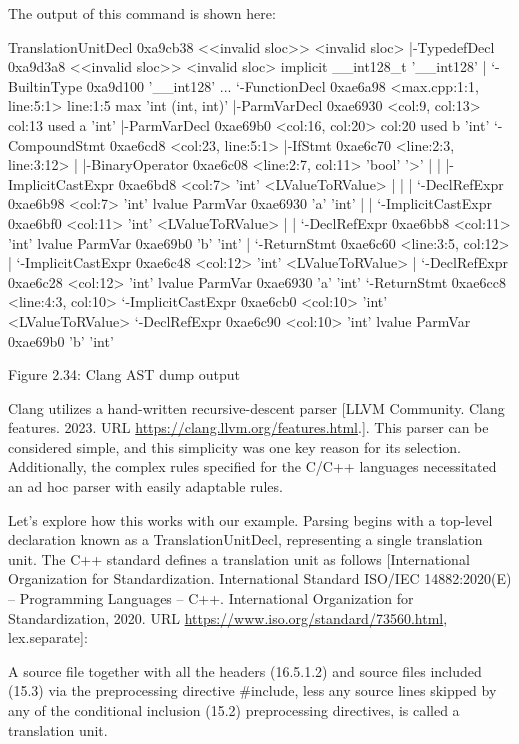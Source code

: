 The output of this command is shown here:

\begin{shell}
TranslationUnitDecl 0xa9cb38 <<invalid sloc>> <invalid sloc>
|-TypedefDecl 0xa9d3a8 <<invalid sloc>> <invalid sloc>
implicit __int128_t ’__int128’
| ‘-BuiltinType 0xa9d100 ’__int128’
...
‘-FunctionDecl 0xae6a98 <max.cpp:1:1, line:5:1> line:1:5 max
’int (int, int)’
  |-ParmVarDecl 0xae6930 <col:9, col:13> col:13 used a ’int’
  |-ParmVarDecl 0xae69b0 <col:16, col:20> col:20 used b ’int’
  ‘-CompoundStmt 0xae6cd8 <col:23, line:5:1>
    |-IfStmt 0xae6c70 <line:2:3, line:3:12>
    | |-BinaryOperator 0xae6c08 <line:2:7, col:11> ’bool’ ’>’
    | | |-ImplicitCastExpr 0xae6bd8 <col:7> ’int’ <LValueToRValue>
    | | | ‘-DeclRefExpr 0xae6b98 <col:7> ’int’ lvalue ParmVar 0xae6930
            ’a’ ’int’
    | | ‘-ImplicitCastExpr 0xae6bf0 <col:11> ’int’ <LValueToRValue>
    | |   ‘-DeclRefExpr 0xae6bb8 <col:11> ’int’ lvalue ParmVar 0xae69b0
            ’b’ ’int’
    | ‘-ReturnStmt 0xae6c60 <line:3:5, col:12>
    |   ‘-ImplicitCastExpr 0xae6c48 <col:12> ’int’ <LValueToRValue>
    |     ‘-DeclRefExpr 0xae6c28 <col:12> ’int’ lvalue ParmVar 0xae6930
            ’a’ ’int’
    ‘-ReturnStmt 0xae6cc8 <line:4:3, col:10>
      ‘-ImplicitCastExpr 0xae6cb0 <col:10> ’int’ <LValueToRValue>
        ‘-DeclRefExpr 0xae6c90 <col:10> ’int’ lvalue ParmVar 0xae69b0
            ’b’ ’int’
\end{shell}

\begin{center}
Figure 2.34: Clang AST dump output
\end{center}

Clang utilizes a hand-written recursive-descent parser [LLVM Community. Clang features. 2023. URL \url{https://clang.llvm.org/features.html}.]. This parser can be considered simple, and this simplicity was one key reason for its selection. Additionally, the complex rules specified for the C/C++ languages necessitated an ad hoc parser with easily adaptable rules.

Let’s explore how this works with our example. Parsing begins with a top-level declaration known as a TranslationUnitDecl, representing a single translation unit. The C++ standard defines a translation unit as follows [International Organization for Standardization. International Standard ISO/IEC 14882:2020(E) – Programming Languages – C++. International Organization for Standardization, 2020. URL \url{https://www.iso.org/standard/73560.html}, lex.separate]:

A source file together with all the headers (16.5.1.2) and source files included (15.3) via the preprocessing directive \#include, less any source lines skipped by any of the conditional inclusion (15.2) preprocessing directives, is called a translation unit.


